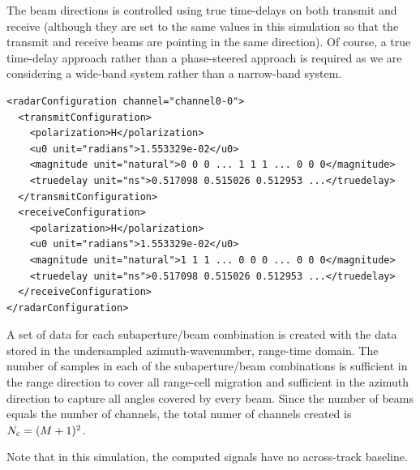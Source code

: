 \par
The beam directions is controlled using true time-delays on both transmit and receive (although they are set to the same values in this simulation so that the transmit and receive beams are pointing in the same direction). Of course, a true time-delay approach rather than a phase-steered approach is required as we are considering a wide-band system rather than a narrow-band system.
\begin{lstlisting}[caption={Channel/Beam configuration}, label={lst:configuration}]
<radarConfiguration channel="channel0-0">
  <transmitConfiguration>
    <polarization>H</polarization>
    <u0 unit="radians">1.553329e-02</u0>
    <magnitude unit="natural">0 0 0 ... 1 1 1 ... 0 0 0</magnitude>
    <truedelay unit="ns">0.517098 0.515026 0.512953 ...</truedelay>
  </transmitConfiguration>
  <receiveConfiguration>
    <polarization>H</polarization>
    <u0 unit="radians">1.553329e-02</u0>
    <magnitude unit="natural">1 1 1 ... 0 0 0 ... 0 0 0</magnitude>
    <truedelay unit="ns">0.517098 0.515026 0.512953 ...</truedelay>
  </receiveConfiguration>
</radarConfiguration>
\end{lstlisting}
A set of data for each subaperture/beam combination is created with the data stored in the undersampled azimuth-wavenumber, range-time domain. The number of samples in each of the subaperture/beam combinations is sufficient in the range direction to cover all range-cell migration and sufficient in the azimuth direction to capture all angles covered by every beam. Since the number of beams equals the number of channels, the total numer of channels created is $N_c = (M+1)^2$.
\par
Note that in this simulation, the computed signals have no across-track baseline.
